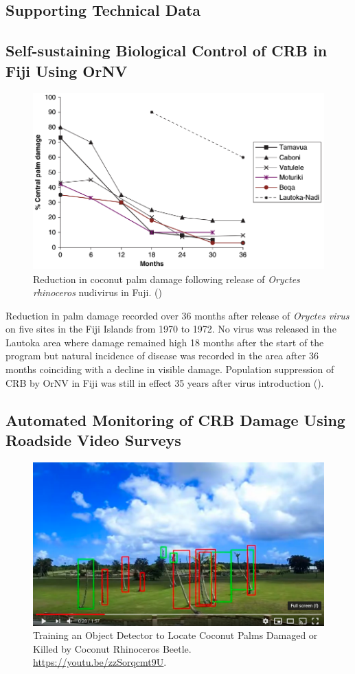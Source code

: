 \documentclass[12pt,letterpaper,english,bibliography=totocnumbered, abstract=on]{scrartcl}
\begin{document}
\newpage{}
\begin{appendices}

\section{Supporting Technical Data}

\subsection{Self-sustaining Biological Control of CRB in Fiji Using OrNV}
\label{sub: fiji}

\begin{figure}[h]
\centering
\includegraphics[width=0.7\linewidth]{images/fiji}
\caption{Reduction in coconut palm damage following release of \textit{Oryctes rhinoceros} nudivirus in Fuji. (\cite{jackson_use_2009-1})}
\label{fig:fiji}
\end{figure}

Reduction in palm damage recorded over 36 months after release of \textit{Oryctes virus} on five sites in the Fiji Islands from 1970 to 1972. No virus was released in the Lautoka area where damage remained high 18 months after the start of the program but natural incidence of disease was recorded in the area after 36 months coinciding with a decline in visible damage. Population suppression of CRB by OrNV in Fiji was still in effect 35 years after virus introduction (\cite{bedford_g._o._long-term_2013}).

\clearpage

\subsection{Automated Monitoring of CRB Damage Using Roadside Video Surveys}

\begin{figure}[h]
\centering
\includegraphics[width=0.7\linewidth]{images/royal-palms}
\caption{Training an Object Detector to Locate Coconut Palms Damaged or Killed by Coconut Rhinoceros Beetle. \url{https://youtu.be/zzSorqcmt9U}.}
\label{fig:royal-palms}
\end{figure}


\end{appendices}
\end{document}
